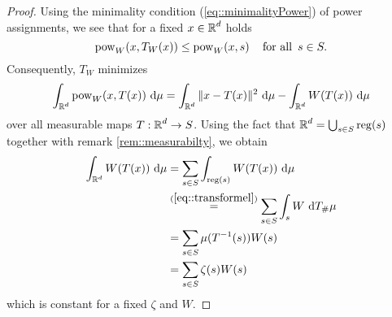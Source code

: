 \documentclass[
     12pt,         %
     a4paper,      %
     BCOR=10mm,     %
     DIV=14,        %
     ]{scrreprt}
\begin{document}
    \begin{proof}[Proof]
        Using the minimality condition (\ref{eq::minimalityPower}) of power assignments, we see that for a fixed $x\in \operatorname{\mathbb{R}}^d$ holds
        \[\pow_W(x,T_W(x)) \le \pow_W(x,s) \quad \forAll s\in S. \] 
        Consequently, $T_W$ minimizes 
        \[ \int_{\operatorname{\mathbb{R}}^d} \operatorname{pow}_W(x,T(x)) \ {\operatorname{{\mathrm{d}}}} \mu =  \int_{\operatorname{\mathbb{R}}^d} \| x - T(x) \|^2 \ {\operatorname{{\mathrm{d}}}} \mu - \int_{\operatorname{\mathbb{R}}^d} W(T(x)) \ {\operatorname{{\mathrm{d}}}} \mu \]
        over all measurable maps $T:\operatorname{\mathbb{R}}^d \to S$. Using the fact that $\operatorname{\mathbb{R}}^d = \bigcup_{s\in S} \operatorname{reg}(s)$ together with remark \ref{rem::measurabilty}, we obtain
        \begin{align*} 
            \int_{\operatorname{\mathbb{R}}^d} W(T(x)) \ {\operatorname{{\mathrm{d}}}} \mu &= \sum_{s\in S} \int_{\operatorname{reg}(s)} W(T(x)) \ {\operatorname{{\mathrm{d}}}} \mu \\ 
                                                 &\overset {(\ref{eq::transformel})}= \sum_{s\in S} \int_{s} W \ {\operatorname{{\mathrm{d}}}} T_{\#}\mu \\
                                                 &= \sum_{s\in S} \mu(T^{-1}(s))W(s) \\
                                                 &= \sum_{s\in S} \zeta(s)W(s) 
        \end{align*}
        which is constant for a fixed $\zeta$ and $W$.
    \end{proof}
\end{document}
